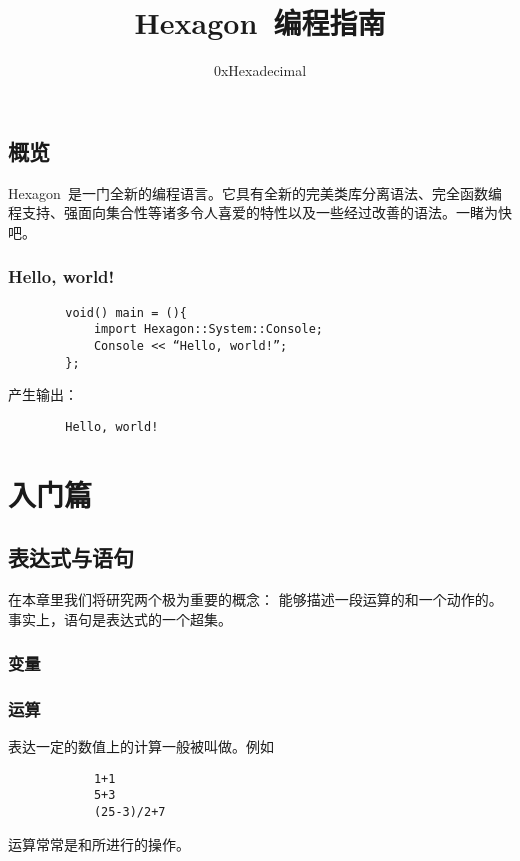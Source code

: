 \documentclass{tufte-book}
\begin{document}
\setlength{\parindent}{2em}
\setcounter{tocdepth}{1}

\frontmatter

\title{Hexagon~编程指南}
\author{0xHexadecimal}
\maketitle

\chapter{概览}
Hexagon~是一门全新的编程语言。它具有全新的完美类库分离语法、完全函数编程支持、强面向集合性等诸多令人喜爱的特性以及一些经过改善的语法。一睹为快吧。
\section{Hello, world!}
	\begin{verbatim}
		void() main = (){
		    import Hexagon::System::Console;
		    Console << “Hello, world!”;
		};
	\end{verbatim}
	产生输出：
	\begin{verbatim}
		Hello, world!
	\end{verbatim}


\tableofcontents

\listoffigures

\listoftables

\mainmatter
\part{入门篇}

	\chapter{表达式与语句}
		在本章里我们将研究两个极为重要的概念：
		能够描述一段运算的和一个动作的。
		事实上，语句是表达式的一个超集。
		\section{变量}
			
		\section{运算}
			表达一定的数值上的计算一般被叫做。例如
			\begin{verbatim}
			1+1
			5+3
			(25-3)/2+7
			\end{verbatim}
			运算常常是和所进行的操作。
			
\end{document}
